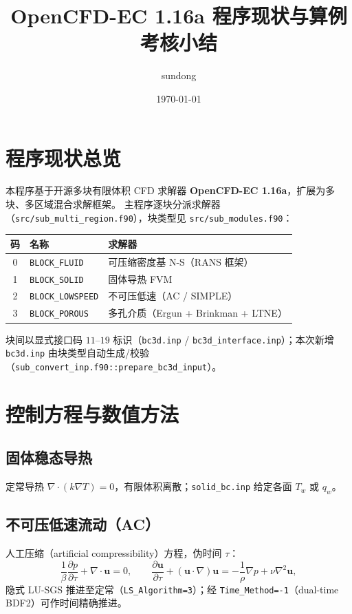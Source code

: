 \documentclass[11pt]{ctexart}
\title{OpenCFD-EC 1.16a 程序现状与算例考核小结}
\author{sundong}
\date{\today}
\begin{document}
\maketitle
\tableofcontents
\bigskip

\section{程序现状总览}
本程序基于开源多块有限体积 CFD 求解器 \textbf{OpenCFD-EC 1.16a}，扩展为多块、多区域混合求解框架。
主程序逐块分派求解器（\texttt{src/sub\_multi\_region.f90}），块类型见 \texttt{src/sub\_modules.f90}：
\begin{center}
\begin{tabular}{cll}
\toprule
码 & 名称 & 求解器 \\
\midrule
0 & \texttt{BLOCK\_FLUID}    & 可压缩密度基 N-S（RANS 框架）\\
1 & \texttt{BLOCK\_SOLID}    & 固体导热 FVM\\
2 & \texttt{BLOCK\_LOWSPEED} & 不可压低速（AC / SIMPLE）\\
3 & \texttt{BLOCK\_POROUS}   & 多孔介质（Ergun + Brinkman + LTNE）\\
\bottomrule
\end{tabular}
\end{center}
块间以显式接口码 $11$--$19$ 标识（\texttt{bc3d.inp} / \texttt{bc3d\_interface.inp}）；本次新增
\texttt{bc3d.inp} 由块类型自动生成/校验（\texttt{sub\_convert\_inp.f90::prepare\_bc3d\_input}）。

\section{控制方程与数值方法}
\subsection{固体稳态导热}
定常导热 $\nabla\!\cdot(k\nabla T)=0$，有限体积离散；\texttt{solid\_bc.inp} 给定各面 $T_w$ 或 $q_w$。
\subsection{不可压低速流动（AC）}
人工压缩（artificial compressibility）方程，伪时间 $\tau$：
\begin{equation}
\frac{1}{\beta}\frac{\partial p}{\partial\tau}+\nabla\!\cdot\bm{u}=0,\qquad
\frac{\partial \bm{u}}{\partial\tau}+(\bm{u}\!\cdot\!\nabla)\bm{u}=-\frac{1}{\rho}\nabla p+\nu\nabla^2\bm{u},
\end{equation}
隐式 LU-SGS 推进至定常（\texttt{LS\_Algorithm=3}）；经 \texttt{Time\_Method=-1}（dual-time BDF2）可作时间精确推进。
\end{document}
